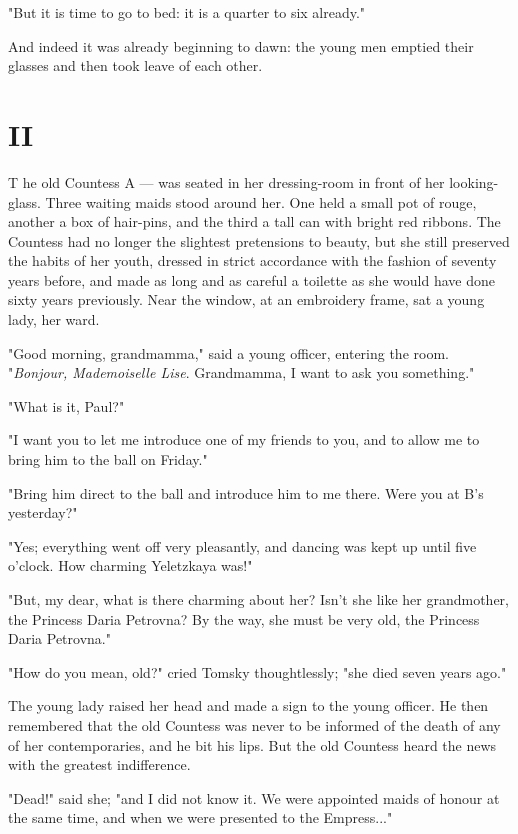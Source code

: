 "But it is time to go to bed: it is a quarter to six already."

And indeed it was already beginning to dawn: the young men emptied
their glasses and then took leave of each other.



\section{II}


\lettrine[lines=3,lhang=0.11,lraise=0,loversize=0.05]{T}{}%
he old Countess A --- was seated in her dressing-room in front of her
looking-glass. Three waiting maids stood around her. One held a small
pot of rouge, another a box of hair-pins, and the third a tall can
with bright red ribbons. The Countess had no longer the slightest
pretensions to beauty, but she still preserved the habits of her
youth, dressed in strict accordance with the fashion of seventy years
before, and made as long and as careful a toilette as she would have
done sixty years previously. Near the window, at an embroidery frame,
sat a young lady, her ward.

"Good morning, grandmamma," said a young officer, entering the room.
"\emph{Bonjour, Mademoiselle Lise}. Grandmamma, I want to ask you
something."

"What is it, Paul?"

"I want you to let me introduce one of my friends to you, and to allow
me to bring him to the ball on Friday."

"Bring him direct to the ball and introduce him to me there. Were you
at B's yesterday?"

"Yes; everything went off very pleasantly, and dancing was kept up
until five o'clock. How charming Yeletzkaya was!"

"But, my dear, what is there charming about her? Isn't she like her
grandmother, the Princess Daria Petrovna? By the way, she must be very
old, the Princess Daria Petrovna."

"How do you mean, old?" cried Tomsky thoughtlessly; "she died seven
years ago."

The young lady raised her head and made a sign to the young officer.
He then remembered that the old Countess was never to be informed of
the death of any of her contemporaries, and he bit his lips. But the
old Countess heard the news with the greatest indifference.

"Dead!" said she; "and I did not know it. We were appointed maids of
honour at the same time, and when we were presented to the Empress..."

